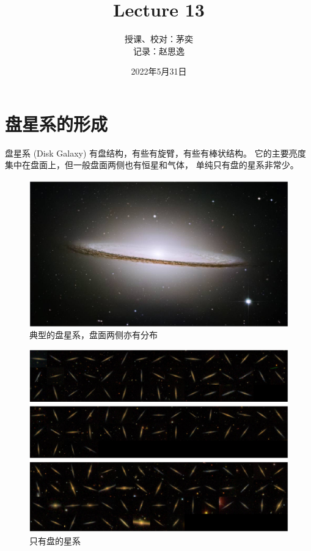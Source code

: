 \documentclass[12pt]{ctexart}
\title{Lecture 13}
\author{授课、校对：茅奕  \\ 记录：赵思逸}
\date{2022年5月31日}
\begin{document}
\maketitle





\section{盘星系的形成}

盘星系 (Disk Galaxy) 有盘结构，有些有旋臂，有些有棒状结构。
它的主要亮度集中在盘面上，但一般盘面两侧也有恒星和气体，
单纯只有盘的星系非常少。

\begin{figure}[!hbtp]
	\centering 
	\includegraphics[width=1.0\linewidth]{disk_galaxy.png}
	\caption{典型的盘星系，盘面两侧亦有分布}
    \label{fig:disk}
\end{figure}

\begin{figure}[!hbtp]
	\centering 
	\includegraphics[width=1.0\linewidth]{pure_disk.png}
	\caption{只有盘的星系}
    \label{fig:pure-disk}
\end{figure}
\end{document}
